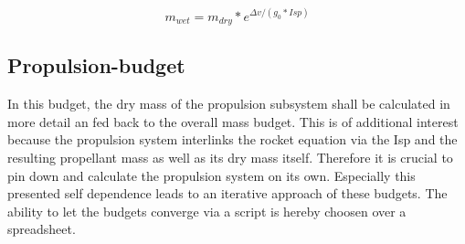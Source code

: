 \begin{equation}
    m_{wet} = m_{dry} * e^{\Delta v/(g_{0}*Isp)}
    \label{eq:5}
\end{equation}

\subsection{Propulsion-budget}
In this budget, the dry mass of the propulsion subsystem shall be calculated in more detail an fed back to the overall mass budget. This is of additional interest because the propulsion system interlinks the rocket equation via the Isp and the resulting propellant mass as well as its dry mass itself. Therefore it is crucial to pin down and calculate the propulsion system on its own. Especially this presented self dependence leads to an iterative approach of these budgets. The ability to let the budgets converge via a script is hereby choosen over a spreadsheet. 
